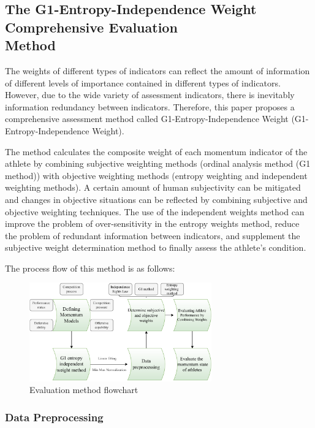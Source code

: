 \documentclass[12pt]{article}  %
\begin{document}
\subsection{The G1-Entropy-Independence Weight Comprehensive Evaluation\\ Method}
The weights of different types of indicators can reflect the amount of information of different levels of importance contained in different types of indicators. However, due to the wide variety of assessment indicators, there is inevitably information redundancy between indicators. Therefore, this paper proposes a comprehensive assessment method called G1-Entropy-Independence Weight (G1-Entropy-Independence Weight).

The method calculates the composite weight of each momentum indicator of the athlete by combining subjective weighting methods (ordinal analysis method (G1 method)) with objective weighting methods (entropy weighting and independent weighting methods). A certain amount of human subjectivity can be mitigated and changes in objective situations can be reflected by combining subjective and objective weighting techniques. The use of the independent weights method can improve the problem of over-sensitivity in the entropy weights method, reduce the problem of redundant information between indicators, and supplement the subjective weight determination method to finally assess the athlete's condition.

The process flow of this method is as follows:

\begin{figure}[h] %
	\centering %
	\includegraphics[width=0.7\textwidth]{picture/第一问的流程图.pdf} %
	\caption{Evaluation method flowchart} %
	\label{fig:example} %
\end{figure}
\FloatBarrier

\subsubsection{Data Preprocessing}
\end{document}
